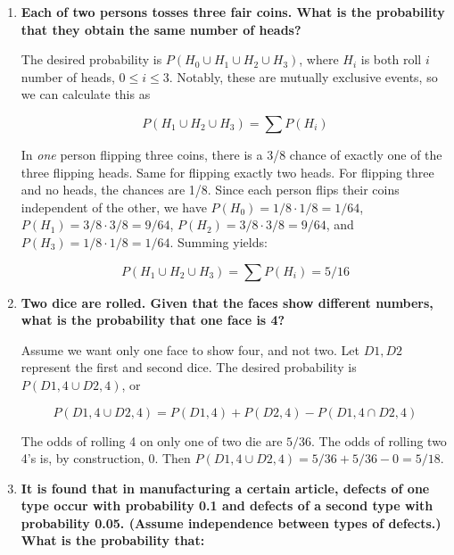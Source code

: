 \documentclass[10pt, oneside]{article}
\begin{document}
\begin{enumerate}[label=3.\arabic*]
\item  \begin{tcolorbox}[
  colback=Cerulean!5!white,
  colframe=Cerulean!75!black]
\textbf{Each of two persons tosses three fair coins. What is the probability that they obtain the same number of heads?}
\end{tcolorbox}

The desired probability is $P(H_0 \cup H_1 \cup H_2 \cup H_3)$, where $H_i$ is both roll $i$ number of heads, $0 \leq i \leq 3$. Notably, these are mutually exclusive events, so we can calculate this as

\[ P(H_1 \cup H_2 \cup H_3) = \sum P(H_i) \]

In \textit{one} person flipping three coins, there is a 3/8 chance of exactly one of the three flipping heads. Same for flipping exactly two heads. For flipping three and no heads, the chances are 1/8. Since each person flips their coins independent of the other, we have $P(H_0) = 1/8 \cdot 1/8 = 1/64$, $P(H_1) = 3/8 \cdot 3/8 = 9/64$, $P(H_2) = 3/8 \cdot 3/8 = 9/64$, and $P(H_3) = 1/8 \cdot 1/8 = 1/64$. Summing yields:

\[ P(H_1 \cup H_2 \cup H_3) = \sum P(H_i) = \boxed{5/16} \]

\item  \begin{tcolorbox}[
  colback=Cerulean!5!white,
  colframe=Cerulean!75!black]
\textbf{Two dice are rolled. Given that the faces show different numbers, what is the probability that one face is 4?}
\end{tcolorbox}

Assume we want only one face to show four, and not two. Let $D1, D2$ represent the first and second dice. The desired probability is $P(D1, 4 \cup D2, 4)$, or

\[ P(D1, 4 \cup D2, 4) = P(D1, 4) + P(D2, 4) - P(D1,4 \cap D2,4) \]

The odds of rolling 4 on only one of two die are $5/36$. The odds of rolling two 4's is, by construction, $0$. Then $P(D1, 4 \cup D2, 4) = 5/36 + 5/36 - 0 = \boxed{5/18}$.

\item  \begin{tcolorbox}[
  colback=Cerulean!5!white,
  colframe=Cerulean!75!black]
\textbf{It is found that in manufacturing a certain article, defects of one type occur with probability 0.1 and defects of a second type with probability 0.05. (Assume independence between types of defects.) What is the probability that:}
\end{tcolorbox}


\end{enumerate}
\end{document}
